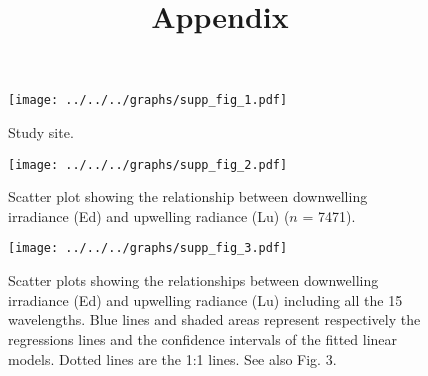 \documentclass[12pt,a4paper]{scrartcl}
\title{Appendix}
\date{}
\begin{document}
    \maketitle

     \begin{figure}[h]
         \centering
         \texttt{[image: ../../../graphs/supp\_fig\_1.pdf]}
         \caption{Study site.}
     \end{figure}

    \clearpage
    \newpage

    \begin{figure}[h]
        \centering
        \texttt{[image: ../../../graphs/supp\_fig\_2.pdf]}
        \caption{Scatter plot showing the relationship between downwelling irradiance (Ed) and upwelling radiance (Lu) ($n$ = 7471).}
    \end{figure}

    \clearpage
    \newpage

    \begin{figure}[h]
        \centering
        \texttt{[image: ../../../graphs/supp\_fig\_3.pdf]}
        \caption{Scatter plots showing the relationships between downwelling irradiance (Ed) and upwelling radiance (Lu) including all the 15 wavelengths. Blue lines and shaded areas represent respectively the regressions lines and the confidence intervals of the fitted linear models. Dotted lines are the 1:1 lines. See also Fig. 3.}
    \end{figure}

    
\end{document}
